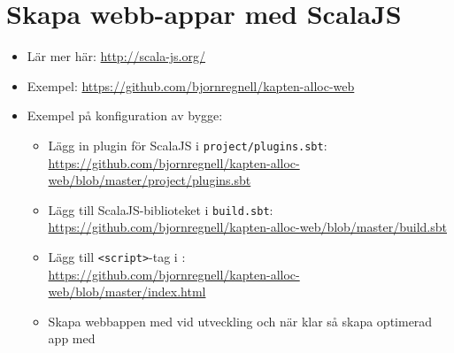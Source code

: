 
\chapter{Skapa webb-appar med ScalaJS}\label{appendix:scalajs}

\begin{itemize}
\item Lär mer här: \url{http://scala-js.org/}
\item Exempel: \url{https://github.com/bjornregnell/kapten-alloc-web}
\item Exempel på konfiguration av bygge:
\begin{itemize}
\item Lägg in plugin för ScalaJS i \texttt{project/plugins.sbt}: \\\url{https://github.com/bjornregnell/kapten-alloc-web/blob/master/project/plugins.sbt}
\item Lägg till ScalaJS-biblioteket i \texttt{build.sbt}: \\\url{https://github.com/bjornregnell/kapten-alloc-web/blob/master/build.sbt} 
\item Lägg till \texttt{<script>}-tag i : \\\url{https://github.com/bjornregnell/kapten-alloc-web/blob/master/index.html} 
\item Skapa webbappen med  vid utveckling och när klar så skapa optimerad app med 
\end{itemize}
\end{itemize}